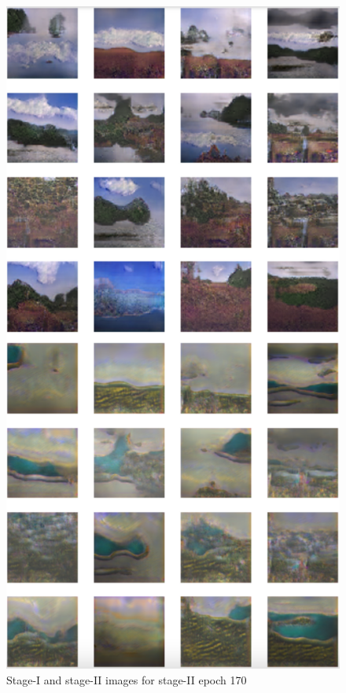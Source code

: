 \documentclass{article}
\begin{document}
	\begin{figure}[h]
	\centering
	\includegraphics[scale=0.6]{images/epoch170_FID399.png}
	\caption{Stage-I and stage-II images for stage-II epoch 170}
	\end{figure}
\end{document}
